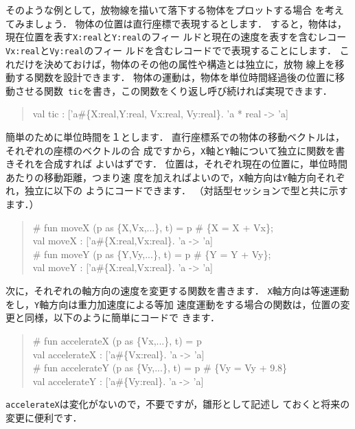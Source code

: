 \documentclass{jbook}
\begin{document}
	そのような例として，放物線を描いて落下する物体をプロットする場合
を考えてみましょう． 
	物体の位置は直行座標で表現するとします．
	すると，物体は，現在位置を表す{\tt X:real}と{\tt Y:real}のフィー
ルドと現在の速度を表すを含むレコー{\tt Vx:real}と{\tt Vy:real}のフィー
ルドを含むレコードでで表現することにします．
	これだけを決めておけば，物体のその他の属性や構造とは独立に，放物
線上を移動する関数を設計できます．
	物体の運動は，物体を単位時間経過後の位置に移動させる関数{\tt
tic}を書き，この関数をくり返し呼び続ければ実現できます．
\begin{tt}\begin{quote}
val tic : ['a\#\{X:real,Y:real, Vx:real, Vy:real\}. 'a * real -> 'a]
\end{quote}\end{tt}
	簡単のために単位時間を１とします．
	直行座標系での物体の移動ベクトルは，それぞれの座標のベクトルの合
成ですから，{\tt X}軸と{\tt Y}軸について独立に関数を書きそれを合成すれば
よいはずです．
	位置は，それぞれ現在の位置に，単位時間あたりの移動距離，つまり速
度を加えればよいので，{\tt X}軸方向は{\tt Y}軸方向それぞれ，独立に以下の
ようにコードできます．
	（対話型セッションで型と共に示すます．）
\begin{tt}\begin{quote}
\# fun moveX (p as \{X,Vx,...\}, t) = p \# \{X = X + Vx\};\\
val moveX : ['a\#\{X:real,Vx:real\}. 'a -> 'a]\\
\# fun moveY (p as \{Y,Vy,...\}, t) = p \# \{Y = Y + Vy\};\\
val moveY : ['a\#\{X:real,Vx:real\}. 'a -> 'a]
\end{quote}\end{tt}
	次に，それぞれの軸方向の速度を変更する関数を書きます．
	{\tt X}軸方向は等速運動をし，{\tt Y}軸方向は重力加速度による等加
速度運動をする場合の関数は，位置の変更と同様，以下のように簡単にコードで
きます．
\begin{tt}\begin{quote}
\# fun accelerateX (p as \{Vx,...\}, t) = p\\
val accelerateX : ['a\#\{Vx:real\}. 'a -> 'a]\\
\# fun accelerateY (p as \{Vy,...\}, t) = p \# \{Vy = Vy + 9.8\}\\
val accelerateY : ['a\#\{Vy:real\}. 'a -> 'a]\\
\end{quote}\end{tt}
	{\tt accelerateX}は変化がないので，不要ですが，雛形として記述し
ておくと将来の変更に便利です．
	
\end{document}
